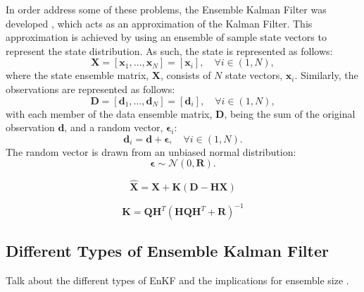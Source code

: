 In order address some of these problems, the Ensemble Kalman Filter was
developed \citep{evensen2003ensemble,
evensen2009ensemble}, which acts as an approximation of the Kalman Filter.
This approximation is achieved by using an ensemble of sample state vectors to
represent the state distribution.
As such, the state is represented as follows:
\begin{equation}
    \mathbf{X} = \left[ \mathbf{x}_1, \ldots, \mathbf{x}_N \right]
               = \left[ \mathbf{x}_i \right], \quad \forall i \in (1, N),
\end{equation}
where the state ensemble matrix, $\mathbf{X}$, consists of $N$ state vectors,
$\mathbf{x}_i$.
Similarly, the observations are represented as follows:
\begin{equation}
    \mathbf{D} = \left[ \mathbf{d}_1, \ldots, \mathbf{d}_N \right]
               = \left[ \mathbf{d}_i \right], \quad \forall i \in (1, N),
\end{equation}
with each member of the data ensemble matrix, $\mathbf{D}$, being the sum of the
original observation $\mathbf{d}$, and a random vector, $\mathbf{\epsilon}_i$:
\begin{equation}
    \mathbf{d}_i = \mathbf{d} + \mathbf{\epsilon}, \quad
                   \forall i \in (1, N).
\end{equation}
The random vector is drawn from an unbiased normal distribution:
\begin{equation}
    \mathbf{\epsilon} \sim \mathcal{N} (0, \mathbf{R}).
\end{equation}

\begin{equation}
    \hat{\mathbf{X}} = \mathbf{X} + \mathbf{K}
                       \left(
                       \mathbf{D} - \mathbf{H} \mathbf{X}
                       \right)
\end{equation}

\begin{equation}
    \mathbf{K} = \mathbf{Q} \mathbf{H}^T
                 {\left(
                    \mathbf{H} \mathbf{Q} \mathbf{H}^T
                    + \mathbf{R}
                 \right)} ^ {-1}
\end{equation}

\subsection{Different Types of Ensemble Kalman Filter}\label{sec:method:types}

Talk about the different types of EnKF and the implications for ensemble size
\citep{keller2018comparing}.

